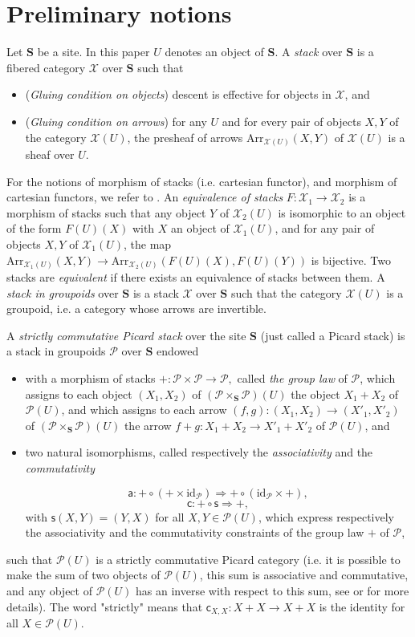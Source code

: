 \documentclass[11pt]{amsart}
\newcommand{\cP}{\mathcal{P}}
\newcommand{\cX}{\mathcal{X}}
\newcommand{\ass}{\mathsf{a}}
\newcommand{\id}{\mathrm{id}}
\newcommand{\comm}{\mathsf{c}}
\newcommand{\bS}{\textbf{S}}
\theoremstyle{definition}
\numberwithin{equation}{section}
\begin{document}
\section{Preliminary notions}\label{2-St-and-Pic-St}


Let $\bS$ be a site. In this paper $U$ denotes an object of $\bS$.  A \textit{stack} over $\bS$ is a fibered category $\cX$ over $\bS$ such that 
\begin{itemize}
	\item (\emph{Gluing condition on objects}) descent is effective for objects in $\cX$, and
	\item (\emph{Gluing condition on arrows}) for any $U$ and for every pair of objects $X,Y$ of the category $\cX(U)$, the presheaf of arrows $\mathrm{Arr}_{\cX(U)}(X,Y)$ of $\cX(U)$ is a sheaf over $U$.
\end{itemize}



For the notions of morphism of stacks (i.e. cartesian functor), and morphism of cartesian functors, we refer to 
\cite[Chp II 1.2]{Gi}. An \textit{equivalence of stacks} $F: \cX_1 \to \cX_2$ is a morphism of stacks such that any object $Y $ of $\cX_2(U)$ is isomorphic to an object of the form $F(U)(X)$ with $X$ an object of $\cX_1(U)$, and for any pair of objects $X,Y  $ of $\cX_1(U)$, the map
$\mathrm{Arr}_{\cX_1(U)}(X,Y) \to \mathrm{Arr}_{\cX_2(U)}(F(U)(X),F(U)(Y))$ is bijective.
Two stacks are \textit{equivalent} if there exists an equivalence of stacks between them.
A \textit{stack in groupoids} over $\bS$ is a stack $\cX$ over $\bS$ such that the category $\cX(U)$ is a groupoid, i.e. a category whose arrows are invertible. 




A \textit{strictly commutative Picard stack} over the site $\bS$ (just called a Picard stack) is a stack in groupoids $\cP$ over $\bS$ endowed
\begin{itemize}
	\item  with a morphism of stacks  $ +: \cP \times \cP \rightarrow \cP,$ called \emph{the group law} of $\cP$, which assigns to each object 
	$(X_1,X_2)$ of $(\cP \times_{\bS} \cP) (U)$ the object $X_1+X_2$ of $\cP(U)$,  and which assigns to each arrow $(f,g): (X_1,X_2) \to (X'_1,X'_2)$ of $(\cP \times_{\bS} \cP)(U)$ the arrow $f+g: X_1+X_2 \to X'_1+X'_2$ of $\cP (U)$, and 
	\item two 
	natural isomorphisms, called respectively the \emph{associativity} and the \emph{commutativity}
	
	$$\ass :+\circ (+\times \id_\cP) \Rightarrow +\circ (\id_\cP \times +),$$ 
	$$\comm : +\circ \mathsf{s} \Rightarrow +,$$
	with $ \mathsf{s}(X,Y)=(Y,X)$ for all $X,Y \in \cP(U)$, which express respectively the associativity and the commutativity constraints of the group law $+$ of $\cP$,
\end{itemize}
such that $\cP (U)$ is a strictly commutative Picard category (i.e. it is possible to make the sum of two objects of $\cP(U)$, this sum is associative and commutative, and any object of $\cP(U)$ has an inverse with respect to this sum, see \cite[\S 1]{B13} or \cite[\S 1.4]{De}
 for more details). The word "strictly" means that $\comm_{X,X}: X+X \to X+X$ is the identity 
for all $X \in \cP(U)$.
\end{document}
